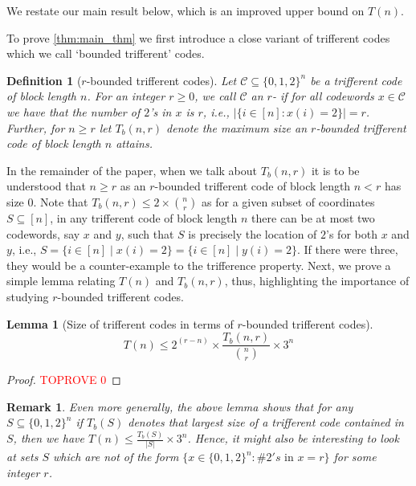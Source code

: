 \documentclass[10pt,a4paper]{article}
\newcommand{\rbdtrifferentcodes}{$r$-bounded trifferent code}
\newcommand{\calC}{\mathcal{C}}
\newcommand{\define}[1]{\textsb{#1}}
\newcommand{\set}[1]{\{#1\}}
\newtheorem{lemma}[theorem]{Lemma}
\newtheorem{definition}{Definition}[section]
\newtheorem{remark}[theorem]{Remark}
\DeclareMathOperator{\1}{\mathbf{1}}
\begin{document}
We restate our main result below, which is an improved upper bound on $T(n)$.
\maintheorem*



To prove \cref{thm:main_thm} we first introduce a close variant of trifferent codes which we call `bounded trifferent' codes. 

\begin{definition}[\rbdtrifferentcodes{s}]
\label{defn:rbdtriffcodes}
	Let $\calC\subseteq\set{0,1,2}^n$ be a trifferent code of block length $n$.
	For an integer $r\geq 0$, we call $\calC$ an $r$-\define{bounded trifferent code} if for all codewords $x\in \calC$ we have that the number of $2$'s in $x$ is $r$, i.e., $|\set{i\in [n]\colon x(i)=2}|= r$. 
	Further, for $n\geq r$ let $T_b(n,r)$ denote the maximum size an \rbdtrifferentcodes{} of block length $n$ attains.
\end{definition}

In the remainder of the paper, when we talk about $T_b(n,r)$ it is to be understood that $n\geq r$ as an \rbdtrifferentcodes{} of block length $n< r$ has size $0$.
Note that $T_b(n,r)\leq 2\times \binom{n}{r} $ as for a given subset of coordinates $S\subseteq[n]$, in any trifferent code of block length $n$ there can be at most two codewords, say $x$ and $y$, such that $S$ is precisely the location of $2$'s for both $x$ and $y$, i.e., $S = \set{i\in [n]\mid x(i) = 2} = \set{i\in [n]\mid y(i) = 2}$.
If there were three, they would be a counter-example to the trifference property.
Next, we prove a simple lemma relating $T(n)$ and $T_b(n,r)$, thus, highlighting the importance of studying \rbdtrifferentcodes{s}.

\begin{lemma}[Size of trifferent codes in terms of \rbdtrifferentcodes{s}]
\label{lem:size_relation_triff_rbdtriff}
	$$T(n)\leq 2^{(r-n)} \times \frac{T_b(n,r)}{\displaystyle \binom{n}{r}} \times 3^n$$
\end{lemma}
\begin{proof}\textcolor{red}{TOPROVE 0}\end{proof}

\begin{remark}
    Even more generally, the above lemma shows that for any $S\subseteq\set{0,1,2}^n$ if $T_b(S)$ denotes that largest size of a trifferent code contained in $S$, then we have $T(n)\leq \frac{T_b(S)}{|S|} \times 3^n$.
	Hence, it might also be interesting to look at sets $S$ which are not of the form $\set{x\in \set{0,1,2}^n \colon \#2's \text{ in } x= r}$ for some integer $r$.
\end{remark}
\end{document}
